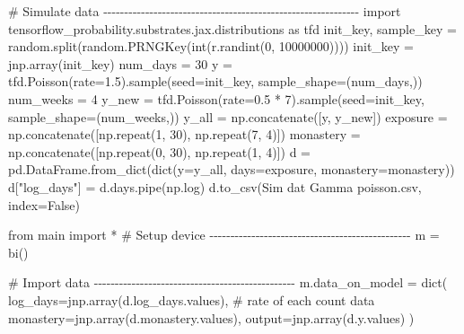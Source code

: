 \documentclass[
  letterpaper,
  DIV=11,
  numbers=noendperiod]{scrreprt}
\newenvironment{Shaded}{\begin{snugshade}}{\end{snugshade}}
\newcommand{\BuiltInTok}[1]{\textcolor[rgb]{0.00,0.23,0.31}{#1}}
\newcommand{\CommentTok}[1]{\textcolor[rgb]{0.37,0.37,0.37}{#1}}
\newcommand{\DecValTok}[1]{\textcolor[rgb]{0.68,0.00,0.00}{#1}}
\newcommand{\FloatTok}[1]{\textcolor[rgb]{0.68,0.00,0.00}{#1}}
\newcommand{\ImportTok}[1]{\textcolor[rgb]{0.00,0.46,0.62}{#1}}
\newcommand{\NormalTok}[1]{\textcolor[rgb]{0.00,0.23,0.31}{#1}}
\newcommand{\OperatorTok}[1]{\textcolor[rgb]{0.37,0.37,0.37}{#1}}
\newcommand{\StringTok}[1]{\textcolor[rgb]{0.13,0.47,0.30}{#1}}
\newcommand{\VariableTok}[1]{\textcolor[rgb]{0.07,0.07,0.07}{#1}}
\begin{document}
\begin{Shaded}
\begin{Highlighting}[]
\CommentTok{\# Simulate data {-}{-}{-}{-}{-}{-}{-}{-}{-}{-}{-}{-}{-}{-}{-}{-}{-}{-}{-}{-}{-}{-}{-}{-}{-}{-}{-}{-}{-}{-}{-}{-}{-}{-}{-}{-}{-}{-}{-}{-}{-}{-}{-}{-}{-}{-}{-}{-}{-}{-}{-}{-}{-}{-}{-}{-}{-}{-}{-}{-}{-}}
\ImportTok{import}\NormalTok{ tensorflow\_probability.substrates.jax.distributions }\ImportTok{as}\NormalTok{ tfd}
\NormalTok{init\_key, sample\_key }\OperatorTok{=}\NormalTok{ random.split(random.PRNGKey(}\BuiltInTok{int}\NormalTok{(r.randint(}\DecValTok{0}\NormalTok{, }\DecValTok{10000000}\NormalTok{))))}
\NormalTok{init\_key }\OperatorTok{=}\NormalTok{ jnp.array(init\_key)}
\NormalTok{num\_days }\OperatorTok{=} \DecValTok{30}
\NormalTok{y }\OperatorTok{=}\NormalTok{ tfd.Poisson(rate}\OperatorTok{=}\FloatTok{1.5}\NormalTok{).sample(seed}\OperatorTok{=}\NormalTok{init\_key, sample\_shape}\OperatorTok{=}\NormalTok{(num\_days,))}
\NormalTok{num\_weeks }\OperatorTok{=} \DecValTok{4}
\NormalTok{y\_new }\OperatorTok{=}\NormalTok{ tfd.Poisson(rate}\OperatorTok{=}\FloatTok{0.5} \OperatorTok{*} \DecValTok{7}\NormalTok{).sample(seed}\OperatorTok{=}\NormalTok{init\_key, sample\_shape}\OperatorTok{=}\NormalTok{(num\_weeks,))}
\NormalTok{y\_all }\OperatorTok{=}\NormalTok{ np.concatenate([y, y\_new])}
\NormalTok{exposure }\OperatorTok{=}\NormalTok{ np.concatenate([np.repeat(}\DecValTok{1}\NormalTok{, }\DecValTok{30}\NormalTok{), np.repeat(}\DecValTok{7}\NormalTok{, }\DecValTok{4}\NormalTok{)])}
\NormalTok{monastery }\OperatorTok{=}\NormalTok{ np.concatenate([np.repeat(}\DecValTok{0}\NormalTok{, }\DecValTok{30}\NormalTok{), np.repeat(}\DecValTok{1}\NormalTok{, }\DecValTok{4}\NormalTok{)])}
\NormalTok{d }\OperatorTok{=}\NormalTok{ pd.DataFrame.from\_dict(}\BuiltInTok{dict}\NormalTok{(y}\OperatorTok{=}\NormalTok{y\_all, days}\OperatorTok{=}\NormalTok{exposure, monastery}\OperatorTok{=}\NormalTok{monastery))}
\NormalTok{d[}\StringTok{"log\_days"}\NormalTok{] }\OperatorTok{=}\NormalTok{ d.days.pipe(np.log)}
\NormalTok{d.to\_csv(}\StringTok{\textquotesingle{}Sim dat Gamma poisson.csv\textquotesingle{}}\NormalTok{, index}\OperatorTok{=}\VariableTok{False}\NormalTok{)}

\ImportTok{from}\NormalTok{ main }\ImportTok{import} \OperatorTok{*}
\CommentTok{\# Setup device {-}{-}{-}{-}{-}{-}{-}{-}{-}{-}{-}{-}{-}{-}{-}{-}{-}{-}{-}{-}{-}{-}{-}{-}{-}{-}{-}{-}{-}{-}{-}{-}{-}{-}{-}{-}{-}{-}{-}{-}{-}{-}{-}{-}{-}{-}{-}{-}}
\NormalTok{m }\OperatorTok{=}\NormalTok{ bi()}

\CommentTok{\# Import data {-}{-}{-}{-}{-}{-}{-}{-}{-}{-}{-}{-}{-}{-}{-}{-}{-}{-}{-}{-}{-}{-}{-}{-}{-}{-}{-}{-}{-}{-}{-}{-}{-}{-}{-}{-}{-}{-}{-}{-}{-}{-}{-}{-}{-}{-}{-}{-}}
\NormalTok{m.data\_on\_model }\OperatorTok{=} \BuiltInTok{dict}\NormalTok{(}
\NormalTok{    log\_days}\OperatorTok{=}\NormalTok{jnp.array(d.log\_days.values),  }\CommentTok{\# rate of each count data}
\NormalTok{    monastery}\OperatorTok{=}\NormalTok{jnp.array(d.monastery.values),}
\NormalTok{    output}\OperatorTok{=}\NormalTok{jnp.array(d.y.values)}
\NormalTok{)}


\end{Highlighting}
\end{Shaded}
\end{document}
